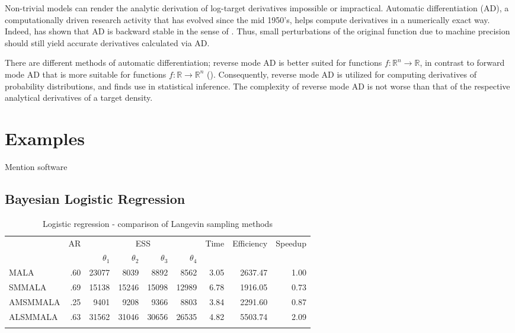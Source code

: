 \documentclass[twoside,11pt]{article}
\begin{document}
{Non-trivial models can render the analytic derivation of log-target derivatives impossible or impractical. Automatic
differentiation (AD), a computationally driven research activity that has evolved since the mid 1950's, helps compute 
derivatives in a numerically exact way. Indeed, \cite{gri__ona} has shown that AD is backward stable in the sense of 
\cite{wil__mod}. Thus, small perturbations of the original function due to machine precision should still yield accurate 
derivatives calculated via AD.

There are different methods of automatic differentiation; reverse mode AD is better suited for functions
$f:\mathbb{R}^n\rightarrow\mathbb{R}$, in contrast to forward mode AD that is more suitable for functions 
$f:\mathbb{R}\rightarrow\mathbb{R}^n$ (\cite{gri_wal__eva}). Consequently, reverse mode AD is utilized for computing 
derivatives of probability distributions, and finds use in statistical inference. The complexity of reverse mode AD is not
worse than that of the respective analytical derivatives of a target density.

\section{Examples}
\label{Examples}

Mention software

\subsection{Bayesian Logistic Regression}

\begin{table}
	\caption{Logistic regression - comparison of Langevin sampling methods}
	\label{tab:logit}
	\begin{tabular}{l|r|rrrr|r|r|r}
		\hline\noalign{\smallskip}
		\multirow{2}{*}{Method} &
		\multirow{2}{*}{AR} &
		\multicolumn{4}{c|}{ESS} &
		\multirow{2}{*}{Time} &
		\multirow{2}{*}{Efficiency} &
		\multirow{2}{*}{Speedup} \\
		& & $\theta_1$ & $\theta_2$ & $\theta_3$ & $\theta_4$ & & & \\
		\noalign{\smallskip}\hline\noalign{\smallskip}
		MALA & .60 & 23077 & 8039 & 8892 & 8562 & 3.05 & 2637.47 & 1.00 \\
		SMMALA & .69 & 15138 & 15246 & 15098 & 12989 & 6.78 & 1916.05 & 0.73 \\
		AMSMMALA & .25 & 9401 & 9208 & 9366 & 8803 & 3.84 & 2291.60 & 0.87 \\
	  ALSMMALA & .63 & 31562 & 31046 & 30656 & 26535 & 4.82 & 5503.74 & 2.09 \\
		\noalign{\smallskip}\hline
	\end{tabular}
\end{table}

}
\end{document}

